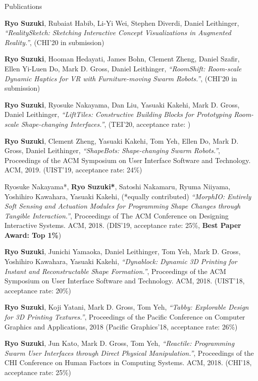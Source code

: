 \documentclass{resume} %
\begin{document}
\begin{rSection}{Publications}

{\bf Ryo Suzuki}, Rubaiat Habib, Li-Yi Wei, Stephen Diverdi, Daniel Leithinger,
{\it ``RealitySketch: Sketching Interactive Concept Visualizations in Augmented Reality.''},
(CHI'20 in submission)

{\bf Ryo Suzuki}, Hooman Hedayati, James Bohn, Clement Zheng, Daniel Szafir, Ellen Yi-Luen Do, Mark D. Gross, Daniel Leithinger,
{\it ``RoomShift: Room-scale Dynamic Haptics for VR with Furniture-moving Swarm Robots.''},
(CHI'20 in submission)

{\bf Ryo Suzuki}, Ryosuke Nakayama, Dan Liu, Yasuaki Kakehi, Mark D. Gross, Daniel Leithinger,
{\it ``LiftTiles: Constructive Building Blocks for Prototyping Room-scale Shape-changing Interfaces.''},
(TEI'20, acceptance rate: )

{\bf Ryo Suzuki}, Clement Zheng, Yasuaki Kakehi, Tom Yeh, Ellen Do, Mark D. Gross, Daniel Leithinger,
{\it ``ShapeBots: Shape-changing Swarm Robots.''},
Proceedings of the ACM Symposium on User Interface Software and Technology. ACM, 2019.
(UIST'19, acceptance rate: 24\%)

Ryosuke Nakayama*, {\bf Ryo Suzuki*}, Satoshi Nakamaru, Ryuma Niiyama, Yoshihiro Kawahara, Yasuaki Kakehi, (*equally contributed)
{\it ``MorphIO: Entirely Soft Sensing and Actuation Modules for Programming Shape Changes through Tangible Interaction.''},
Proceedings of The ACM Conference on Designing Interactive Systems. ACM, 2018.
(DIS'19, acceptance rate: 25\%, {\bf Best Paper Award: Top 1\%})

{\bf Ryo Suzuki}, Junichi Yamaoka, Daniel Leithinger, Tom Yeh, Mark D. Gross, Yoshihiro Kawahara, Yasuaki Kakehi,
{\it ``Dynablock: Dynamic 3D Printing for Instant and Reconstructable Shape Formation.''},
Proceedings of the ACM Symposium on User Interface Software and Technology. ACM, 2018.
(UIST'18, acceptance rate: 20\%)

{\bf Ryo Suzuki}, Koji Yatani, Mark D. Gross, Tom Yeh,
{\it ``Tabby: Explorable Design for 3D Printing Textures.''},
Proceedings of the Pacific Conference on Computer Graphics and Applications, 2018
(Pacific Graphics'18, acceptance rate: 26\%)

{\bf Ryo Suzuki}, Jun Kato, Mark D. Gross, Tom Yeh,
{\it ``Reactile: Programming Swarm User Interfaces through Direct Physical Manipulation.''},
Proceedings of the CHI Conference on Human Factors in Computing Systems. ACM, 2018.
(CHI'18, acceptance rate: 25\%)


\end{rSection}
\end{document}
